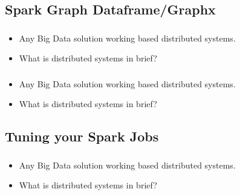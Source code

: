 \subsection{Spark Graph Dataframe/Graphx}

\begin{frame}
  \frametitle{\subsecname}
	\begin{itemize}[<+->]
		\item Any Big Data solution working based distributed systems.
		\item What is distributed systems in brief?
	\end{itemize}
\end{frame}


\begin{frame}
  \frametitle{\subsecname}
	\begin{itemize}[<+->]
		\item Any Big Data solution working based distributed systems.
		\item What is distributed systems in brief?
	\end{itemize}
\end{frame}



\subsection{Tuning your Spark Jobs}


\begin{frame}
  \frametitle{\subsecname}
	\begin{itemize}[<+->]
		\item Any Big Data solution working based distributed systems.
		\item What is distributed systems in brief?
	\end{itemize}
\end{frame}

